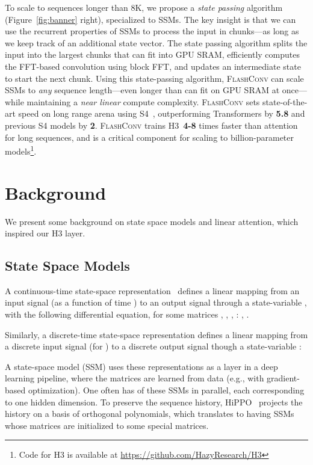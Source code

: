 \documentclass{article}
\newcommand{\fastfft}{\textsc{FlashConv}\xspace}
\newcommand{\hthree}{\textsc{H3}\xspace}
\newcommand{\num}[1]{{\color{red}\bf{#1}\normalfont}}
\newcommand{\num}[1]{#1}
\begin{document}
To scale to sequences longer than 8K, we propose a \textit{state passing} algorithm (Figure~\ref{fig:banner} right), specialized to SSMs.
The key insight is that we can use the recurrent properties of SSMs to process the input in chunks---as long as we keep track of an additional state vector.
The state passing algorithm splits the input into the largest chunks that can fit into GPU SRAM, efficiently computes the FFT-based convolution using block FFT, and updates an intermediate state to start the next chunk.
Using this state-passing algorithm, \fastfft can scale SSMs to \textit{any} sequence length---even longer than can fit on GPU SRAM at once---while maintaining a \textit{near linear} compute complexity.
\fastfft sets state-of-the-art speed on long range arena using S4~\citep{gu2022efficiently}, outperforming Transformers by \num{5.8} and previous S4 models by \num{2}.
\fastfft trains \hthree\ \num{4-8} times faster than attention for long sequences, and is a critical component for scaling to billion-parameter models\footnote{Code for H3 is available at \url{https://github.com/HazyResearch/H3} }.

 \section{Background}
\label{sec:background}

We present some background on state space models and linear attention, which inspired our H3 layer.

\subsection{State Space Models}

A continuous-time state-space representation~\citep{brogan1974modern} defines a linear mapping from an
input signal  (as a function of time ) to an output signal  through a state-variable
, with the following differential equation, for some matrices , , ,
: , .

Similarly, a discrete-time state-space representation defines a linear mapping
from a discrete input signal  (for ) to a discrete output signal
 though a state-variable :


A state-space model (SSM) uses these representations as a layer in a deep learning
pipeline, where the matrices  are learned from data (e.g.,
with gradient-based optimization).
One often has  of these SSMs in parallel, each corresponding to one hidden
dimension.
To preserve the sequence history, HiPPO~\citep{gu2020hippo} projects the history
on a basis of orthogonal polynomials, which translates to having SSMs whose
 matrices are initialized to some special matrices.
\end{document}
